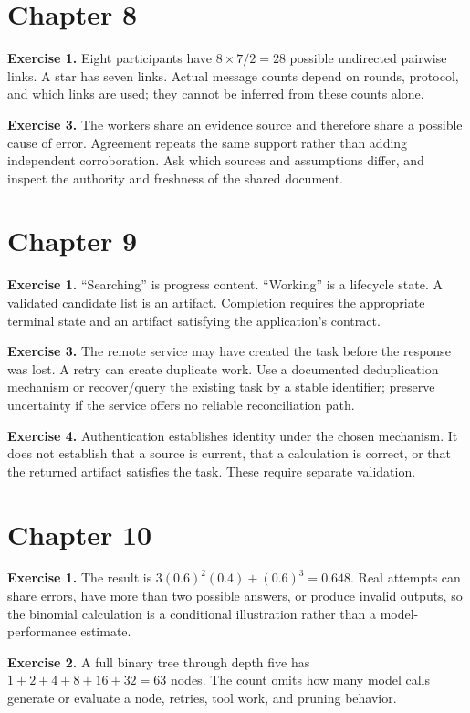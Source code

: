 \section{Chapter 8}
\textbf{Exercise 1.} Eight participants have \(8\times7/2=28\) possible undirected pairwise links. A star has seven links. Actual message counts depend on rounds, protocol, and which links are used; they cannot be inferred from these counts alone.

\textbf{Exercise 3.} The workers share an evidence source and therefore share a possible cause of error. Agreement repeats the same support rather than adding independent corroboration. Ask which sources and assumptions differ, and inspect the authority and freshness of the shared document.

\section{Chapter 9}
\textbf{Exercise 1.} “Searching” is progress content. “Working” is a lifecycle state. A validated candidate list is an artifact. Completion requires the appropriate terminal state and an artifact satisfying the application's contract.

\textbf{Exercise 3.} The remote service may have created the task before the response was lost. A retry can create duplicate work. Use a documented deduplication mechanism or recover/query the existing task by a stable identifier; preserve uncertainty if the service offers no reliable reconciliation path.

\textbf{Exercise 4.} Authentication establishes identity under the chosen mechanism. It does not establish that a source is current, that a calculation is correct, or that the returned artifact satisfies the task. These require separate validation.

\section{Chapter 10}
\textbf{Exercise 1.} The result is \(3(0.6)^2(0.4)+(0.6)^3=0.648\). Real attempts can share errors, have more than two possible answers, or produce invalid outputs, so the binomial calculation is a conditional illustration rather than a model-performance estimate.

\textbf{Exercise 2.} A full binary tree through depth five has \(1+2+4+8+16+32=63\) nodes. The count omits how many model calls generate or evaluate a node, retries, tool work, and pruning behavior.

